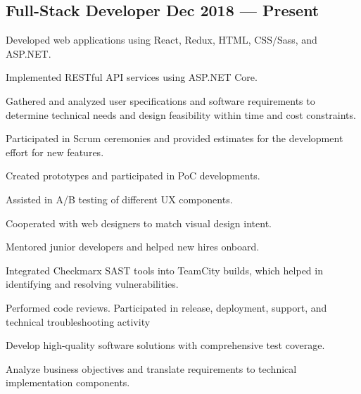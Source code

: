 \subsection{{Full-Stack Developer \hfill Dec 2018 --- Present}}
\begin{zitemize}
\item Developed web applications using React, Redux, HTML, CSS/Sass, and ASP.NET.

\item Implemented RESTful API services using ASP.NET Core.

\item Gathered and analyzed user specifications and software requirements to determine technical needs and design feasibility within time and cost constraints.

\item Participated in Scrum ceremonies and provided estimates for the development effort for new features.

\item Created prototypes and participated in PoC developments.

\item Assisted in A/B testing of different UX components.

\item Cooperated with web designers to match visual design intent.

\item Mentored junior developers and helped new hires onboard.

\item Integrated Checkmarx SAST tools into TeamCity builds, which helped in identifying and resolving vulnerabilities.

\item Performed code reviews. Participated in release, deployment, support, and technical troubleshooting activity

\item Develop high-quality software solutions with comprehensive test coverage.

\item Analyze business objectives and translate requirements to technical implementation components.

\end{zitemize}

